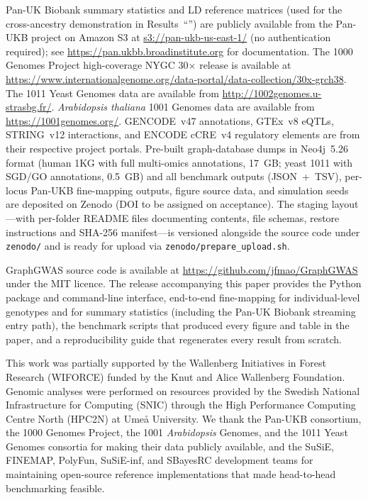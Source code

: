 \documentclass[pdflatex,sn-nature]{sn-jnl}
\begin{document}
Pan-UK Biobank summary statistics and LD reference matrices (used for
the cross-ancestry demonstration in Results~``'') are
publicly available from the Pan-UKB project on Amazon S3 at
\url{s3://pan-ukb-us-east-1/} (no authentication required); see
\url{https://pan.ukbb.broadinstitute.org} for documentation. The 1000
Genomes Project high-coverage NYGC 30$\times$ release is available at
\url{https://www.internationalgenome.org/data-portal/data-collection/30x-grch38}.
The 1011 Yeast Genomes data are available from
\url{http://1002genomes.u-strasbg.fr/}. \emph{Arabidopsis thaliana}
1001 Genomes data are available from
\url{https://1001genomes.org/}. GENCODE~v47 annotations, GTEx~v8
eQTLs, STRING~v12 interactions, and ENCODE cCRE~v4 regulatory
elements are from their respective project portals. Pre-built
graph-database dumps in Neo4j~5.26 format (human 1KG with full
multi-omics annotations, 17~GB; yeast 1011 with SGD/GO
annotations, 0.5~GB) and all benchmark outputs (JSON~+~TSV),
per-locus Pan-UKB fine-mapping outputs, figure source data, and
simulation seeds are deposited on Zenodo (DOI to be assigned on
acceptance). The staging layout---with per-folder README files
documenting contents, file schemas, restore instructions and
SHA-256 manifest---is versioned alongside the source code under
\texttt{zenodo/} and is ready for upload via
\texttt{zenodo/prepare\_upload.sh}.


GraphGWAS source code is available at
\url{https://github.com/jfmao/GraphGWAS} under the MIT licence. The
release accompanying this paper provides the Python package and
command-line interface, end-to-end fine-mapping for individual-level
genotypes and for summary statistics (including the Pan-UK Biobank
streaming entry path), the benchmark scripts that produced every
figure and table in the paper, and a reproducibility guide that
regenerates every result from scratch.


This work was partially supported by the Wallenberg Initiatives in
Forest Research (WIFORCE) funded by the Knut and Alice Wallenberg
Foundation. Genomic analyses were performed on resources provided by
the Swedish National Infrastructure for Computing (SNIC) through the
High Performance Computing Centre North (HPC2N) at Ume\aa{}
University. We thank the Pan-UKB consortium, the 1000 Genomes
Project, the 1001 \emph{Arabidopsis} Genomes, and the 1011 Yeast
Genomes consortia for making their data publicly available, and the
SuSiE, FINEMAP, PolyFun, SuSiE-inf, and SBayesRC development teams
for maintaining open-source reference implementations that made
head-to-head benchmarking feasible.
\end{document}
